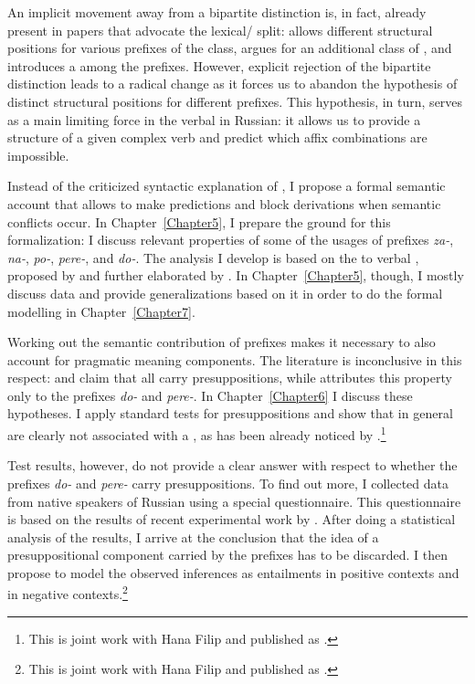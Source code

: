 An implicit movement away from a bipartite distinction is, in fact, already present in papers that advocate the lexical/ split: \citet{Svenonius:04b} allows different structural positions for various prefixes of the  class, \citet{Tatevosov:07} argues for an additional class of , and \citet{Tatevosov:09} introduces a  among the  prefixes. However, explicit rejection of the bipartite distinction leads to a radical change as it forces us to abandon the hypothesis of distinct structural positions for different prefixes. This hypothesis, in turn, serves as a main limiting force in the  verbal  in Russian: it allows us to provide a structure of a given complex verb and predict which affix combinations are impossible.

Instead of the criticized syntactic explanation of , I propose a formal semantic account that allows to make predictions and block derivations when semantic conflicts occur. In Chapter~\ref{Chapter5}, I prepare the ground for this formalization: I discuss relevant properties of some of the usages of prefixes \textit{\mbox{za-}}, \textit{na-}, \textit{po-}, \textit{pere-}, and \textit{do-}. The analysis I develop is based on the  to verbal , proposed by \citet{Filip:08} and further elaborated by \citet{Kagan:12, Kagan:book}. In Chapter~\ref{Chapter5}, though, I mostly discuss data and provide generalizations based on it in order to do the formal modelling in Chapter~\ref{Chapter7}.

Working out the semantic contribution of prefixes makes it necessary to also account for pragmatic meaning components. The literature is inconclusive in this respect: \citet{Paducheva:96} and \citet{Romanova:06} claim that all  carry presuppositions, while \citet{Kagan:book} attributes this property only to the prefixes \textit{do-} and \textit{pere-}. In Chapter~\ref{Chapter6} I discuss these hypotheses. I apply standard tests for presuppositions and show that  in general are clearly not associated with a , as has been already noticed by \citet{Gronn:04}.\footnote{This is joint work with Hana Filip and published as \citealt{ZinovaFilip:14}.}

Test results, however, do not provide a clear answer with respect to whether the prefixes \textit{do-} and \textit{pere-} carry presuppositions. To find out more, I collected data from native speakers of Russian using a special questionnaire. This questionnaire is based on the results of recent experimental work by \citet{Chemla:09}. After doing a statistical analysis of the results, I arrive at the conclusion that the idea of a presuppositional component carried by the prefixes has to be discarded. I then propose to model the observed inferences as entailments in positive contexts and  in negative contexts.\footnote{This is joint work with Hana Filip and published as \citealt{ZinovaFilip:SALT}.}

